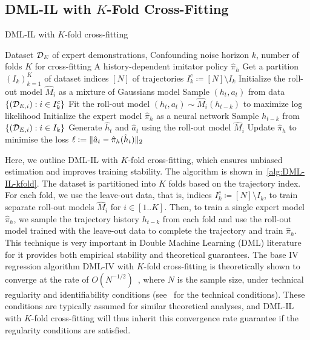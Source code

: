\subsection{DML-IL with $K$-Fold Cross-Fitting}\label{appendix:dmlil}
\begin{algorithm}[tb]
   \caption{DML-IL with $K$-fold cross-fitting}
   \label{alg:DML-IL-kfold}
\begin{algorithmic}
    Dataset $\mathcal{D}_E$ of expert demonstrations, Confounding noise horizon $k$, number of folds $K$ for cross-fitting
     A history-dependent imitator policy $\hat{\pi}_h$
   \STATE Get a partition $(I_k)^K_{k=1}$ of dataset indices $[N]$ of trajectories
   \STATE $I^c_k\coloneqq[N]\setminus I_k$
   \STATE Initialize the roll-out model $\hat{M}_i$ as a mixture of Gaussians model
   \REPEAT
   \STATE Sample $(h_{t},a_t)$ from data $\{(\mathcal{D}_{E,i}):{i\in I^c_k}\}$
   \STATE Fit the roll-out model $(h_t,a_t)\sim\hat{M}_i(h_{t-k})$ to maximize log likelihood
    \ENDFOR
   \STATE Initialize the expert model $\hat \pi_h$ as a neural network
   \REPEAT
{}
   \STATE Sample $h_{t-k}$ from $\{(\mathcal{D}_{E,i}):{i\in I_k}\}$
   \STATE Generate $\hat{h}_t$ and $\hat{a}_t$ using the roll-out model $\hat{M}_i$
   \STATE Update $\hat \pi_h$ to minimise the loss $\ell:= \lVert\hat{a}_t - \hat{\pi}_h (\hat h_t)\rVert_2$
   \ENDFOR
\end{algorithmic}
\end{algorithm}
Here, we outline DML-IL with $K$-fold cross-fitting, which ensures unbiased estimation and improves training stability. The algorithm is shown in~\cref{alg:DML-IL-kfold}. The dataset is partitioned into $K$ folds based on the trajectory index. For each fold, we use the leave-out data, that is, indices $I^c_k\coloneqq[N]\setminus I_k$, to train separate roll-out models $\hat{M}_i$ for $i\in[1..K]$. Then, to train a single expert model $\hat{\pi}_h$, we sample the trajectory history $h_{t-k}$ from each fold and use the roll-out model trained with the leave-out data to complete the trajectory and train $\hat{\pi}_h$. This technique is very important in Double Machine Learning (DML) literature~\citep{Shao2024,Chernozhukov2018Double} for it provides both empirical stability and theoretical guarantees. The base IV regression algorithm DML-IV with $K$-fold cross-fitting is theoretically shown to converge at the rate of $O(N^{-1/2})$~\citep{Shao2024}, where $N$ is the sample size, under technical regularity and identifiability conditions (see~\citet{Shao2024} for the technical conditions). These conditions are typically assumed for similar theoretical analyses, and DML-IL with $K$-fold cross-fitting will thus inherit this convergence rate guarantee if the regularity conditions are satisfied.


